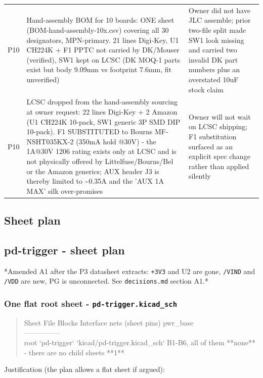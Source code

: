\documentclass[11pt,a4paper]{article}
\begin{document}
{\begin{longtable}{lp{5.2cm}p{7.2cm}}
P10 & Hand-assembly BOM for 10 boards: ONE sheet (BOM-hand-assembly-10x.csv) covering all 30 designators, MPN-primary. 21 lines Digi-Key, U1 CH224K + F1 PPTC not carried by DK/Mouser (verified), SW1 kept on LCSC (DK MOQ-1 parts exist but body 9.09mm vs footprint 7.6mm, fit unverified) & Owner did not have JLC assemble; prior two-file split made SW1 look missing and carried two invalid DK part numbers plus an overstated 10uF stock claim \\
P10 & LCSC dropped from the hand-assembly sourcing at owner request: 22 lines Digi-Key + 2 Amazon (U1 CH224K 10-pack, SW1 generic 3P SMD DIP 10-pack). F1 SUBSTITUTED to Bourns MF-NSHT035KX-2 (350mA hold @30V) - the 1A@30V 1206 rating exists only at LCSC and is not physically offered by Littelfuse/Bourns/Bel or the Amazon generics; AUX header J3 is thereby limited to \textasciitilde{}0.35A and the 'AUX 1A MAX' silk over-promises & Owner will not wait on LCSC shipping; F1 substitution surfaced as an explicit spec change rather than applied silently \\
\bottomrule
\end{longtable}
}
\subsection*{Sheet plan}
\subsection*{pd-trigger - sheet plan}
{*}Amended A1 after the P3 datasheet extracts: \texttt{+3V3} and U2 are gone, \texttt{/VIND} and \texttt{/VDD} are new, PG is unconnected. See \texttt{decisions.md} section A1.{*}

\subsubsection*{One flat root sheet - \texttt{pd-trigger.kicad\_sch}}
\begin{quote}\small\ttfamily\raggedright
\textbar{} Sheet \textbar{} File \textbar{} Blocks \textbar{} Interface nets (sheet pins) \textbar{} pwr\_base \textbar{}\\
\textbar{}---\textbar{}---\textbar{}---\textbar{}---\textbar{}---\textbar{}\\
\textbar{} root `pd-trigger` \textbar{} `kicad/pd-trigger.kicad\_sch` \textbar{} B1-B6, all of them \textbar{} {*}{*}none{*}{*} - there are no child sheets \textbar{} {*}{*}1{*}{*} \textbar{}
\end{quote}
Justification (the plan allows a flat sheet if argued):
\end{document}
